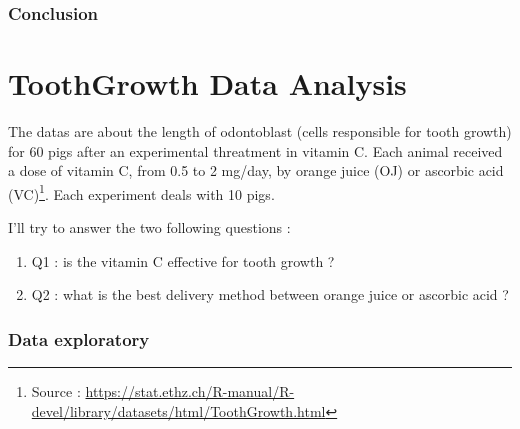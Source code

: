 \documentclass[a4paper, 10pt]{article}\usepackage[]{graphicx}\usepackage[]{color}
\begin{document}
\section{Conclusion}


\newpage

\part{ToothGrowth Data Analysis}
The datas are about the length of odontoblast (cells responsible for tooth growth) for 60 pigs after an experimental threatment in vitamin C. Each animal received a dose of vitamin C, from 0.5 to 2 mg/day, by orange juice (OJ) or ascorbic acid (VC)\footnote{Source : \url{https://stat.ethz.ch/R-manual/R-devel/library/datasets/html/ToothGrowth.html}}. Each experiment deals with 10 pigs.

\noindent
I'll try to answer the two following questions :
\begin{enumerate}
    \item Q1 : is the vitamin C effective for tooth growth ?
    \item Q2 : what is the best delivery method between orange juice or ascorbic acid ?
\end{enumerate}

\section{Data exploratory}
\end{document}
